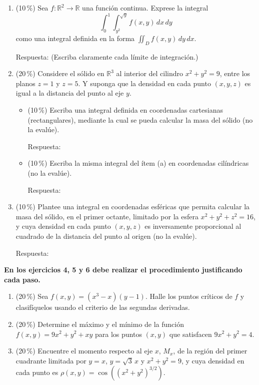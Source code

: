 \documentclass[11pt]{article}
\begin{document}
\begin{enumerate}
\item{} (10\,\%) Sea $f: \mathbb{R}^2 \to \mathbb{R}$ una función continua. Exprese la integral
\[
\int_0^1 \int_{y^2}^{\sqrt y} f(x,y)\,dx\,dy
\]
como una integral definida en la forma $\displaystyle\iint_D f(x,y)\,dy\,dx$.

\vspace{2pt}
\noindent Respuesta: \underline{\phantom{XXXXXXXXXXXXXXXX}}\quad (Escriba claramente cada límite de integración.)

\item{} (20\,\%) Considere el sólido en $\mathbb{R}^3$ al interior del cilindro $x^2 + y^2 = 9$, entre los planos $z = 1$ y $z = 5$. Y suponga que la densidad en cada punto $(x,y,z)$ es igual a la distancia del punto al eje $y$.
\begin{itemize}
\item[(a)] (10\,\%) Escriba una integral definida en coordenadas cartesianas (rectangulares), mediante la cual se pueda calcular la masa del sólido (no la evalúe).

\vspace{2pt}
\noindent Respuesta: \underline{\phantom{XXXXXXXXXXXXXXXX}}
\item[(b)] (10\,\%) Escriba la misma integral del ítem (a) en coordenadas cilíndricas (no la evalúe).

\vspace{2pt}
\noindent Respuesta: \underline{\phantom{XXXXXXXXXXXXXXXX}}
\end{itemize}

\item{} (10\,\%) Plantee una integral en coordenadas esféricas que permita calcular la masa del sólido, en el primer octante, limitado por la esfera $x^2 + y^2 + z^2 = 16$, y cuya densidad en cada punto $(x,y,z)$ es inversamente proporcional al cuadrado de la distancia del punto al origen (no la evalúe).

\vspace{2pt}
\noindent Respuesta: \underline{\phantom{XXXXXXXXXXXXXXXX}}
\end{enumerate}

\vspace{4pt}
\noindent\textbf{En los ejercicios 4, 5 y 6 debe realizar el procedimiento justificando cada paso.}

\begin{enumerate}[start=4]
\item{} (20\,\%) Sea $f(x,y) = (x^3 - x)(y - 1)$. Halle los puntos críticos de $f$ y clasifíquelos usando el criterio de las segundas derivadas.

\item{} (20\,\%) Determine el máximo y el mínimo de la función $f(x,y) = 9x^2 + y^2 + xy$ para los puntos $(x,y)$ que satisfacen $9x^2 + y^2 = 4$.

\item{} (20\,\%) Encuentre el momento respecto al eje $x$, $M_x$, de la región del primer cuadrante limitada por $y = x$, $y = \sqrt3\,x$ y $x^2 + y^2 = 9$, y cuya densidad en cada punto es $\rho(x,y) = \cos\!\left((x^2+y^2)^{3/2}\right)$.
\end{enumerate}

\examfooter
\end{document}
